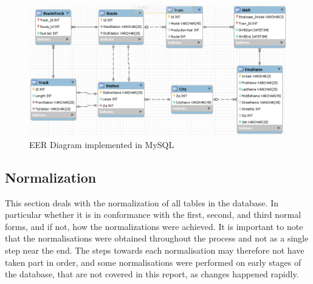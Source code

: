 \begin{figure}
    \centering
    \includegraphics[width=\textwidth]{img/EER.png}
    \caption{EER Diagram implemented in MySQL}
    \label{fig:EER}
\end{figure}

\subsection{Normalization}
This section deals with the normalization of all tables in the database. In 
particular whether it is in conformance with the first, second, and third 
normal forms, and if not, how the normalizations were achieved. It is important 
to note that the normalisations were obtained throughout the process and not as 
a single step near the end. The steps towards each normalisation may therefore 
not have taken part in order, and some normalisations were performed on early 
stages of the database, that are not covered in this report, as changes 
happened rapidly. 

